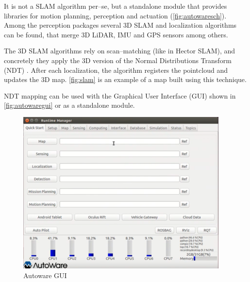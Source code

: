 It is not a SLAM algorithm per--se, but a standalone module that provides libraries for motion planning, perception and actuation (\autoref{fig:autowaresch}). Among the perception packages several 3D SLAM and localization algorithms can be found, that merge 3D LiDAR, IMU and GPS sensors among others.

The 3D SLAM algorithms rely on scan--matching (like in Hector SLAM), and concretely they apply the 3D version of the Normal Distributions Transform (NDT) . After each localization, the algorithm registers the pointcloud and updates the 3D map. \autoref{fig:slam} is an example of a map built using this technique.

NDT mapping can be used with the Graphical User Interface (GUI) shown in \autoref{fig:autowaregui} or as a standalone module.
\begin{figure}[htb]
  \centering
  \includegraphics[width=.9\linewidth]{pictures/03/autowaregui}
  \caption{Autoware GUI}
  \label{fig:autowaregui}
\end{figure}

